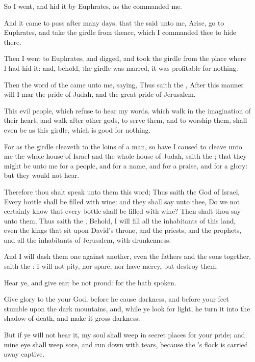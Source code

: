 \Verse So I went, and hid it by Euphrates, as the \LORD commanded me.

\Verse And it came to pass after many days, that the \LORD said unto me, Arise, go to Euphrates, and take the girdle from thence, which I commanded thee to hide there.

\Verse Then I went to Euphrates, and digged, and took the girdle from the place where I had hid it: and, behold, the girdle was marred, it was profitable for nothing.

\Verse Then the word of the \LORD came unto me, saying, \Verse Thus saith the \LORD, After this manner will I mar the pride of Judah, and the great pride of Jerusalem.

\Verse This evil people, which refuse to hear my words, which walk in the imagination of their heart, and walk after other gods, to serve them, and to worship them, shall even be as this girdle, which is good for nothing.

\Verse For as the girdle cleaveth to the loins of a man, so have I caused to cleave unto me the whole house of Israel and the whole house of Judah, saith the \LORD; that they might be unto me for a people, and for a name, and for a praise, and for a glory: but they would not hear.

\Verse Therefore thou shalt speak unto them this word; Thus saith the \LORD God of Israel, Every bottle shall be filled with wine: and they shall say unto thee, Do we not certainly know that every bottle shall be filled with wine?  \Verse Then shalt thou say unto them, Thus saith the \LORD, Behold, I will fill all the inhabitants of this land, even the kings that sit upon David's throne, and the priests, and the prophets, and all the inhabitants of Jerusalem, with drunkenness.

\Verse And I will dash them one against another, even the fathers and the sons together, saith the \LORD: I will not pity, nor spare, nor have mercy, but destroy them.

\Verse Hear ye, and give ear; be not proud: for the \LORD hath spoken.

\Verse Give glory to the \LORD your God, before he cause darkness, and before your feet stumble upon the dark mountains, and, while ye look for light, he turn it into the shadow of death, and make it gross darkness.

\Verse But if ye will not hear it, my soul shall weep in secret places for your pride; and mine eye shall weep sore, and run down with tears, because the \LORD's flock is carried away captive.

